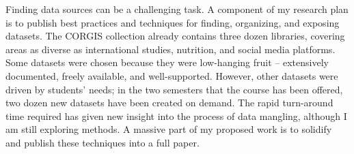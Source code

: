 Finding data sources can be a challenging task.
A component of my research plan is to publish best practices and techniques for finding, organizing, and exposing datasets.
The CORGIS collection already contains three dozen libraries, covering areas as diverse as international studies, nutrition, and social media platforms.
Some datasets were chosen because they were low-hanging fruit -- extensively documented, freely available, and well-supported. 
However, other datasets were driven by students' needs; in the two semesters that the course has been offered, two dozen new datasets have been created on demand.
The rapid turn-around time required has given new insight into the process of data mangling, although I am still exploring methods.
A massive part of my proposed work is to solidify and publish these techniques into a full paper.
